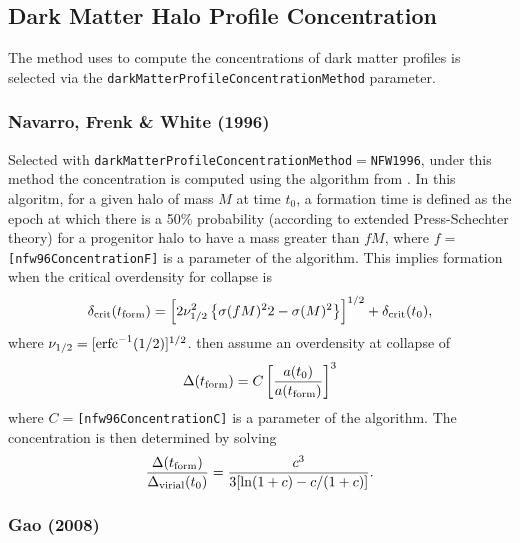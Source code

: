 \subsection{Dark Matter Halo Profile Concentration}\label{sec:DarkMatterProfileConcentration}

The method uses to compute the concentrations of dark matter profiles is selected via the {\tt darkMatterProfileConcentrationMethod} parameter.

\subsubsection{Navarro, Frenk \& White (1996)}\label{phys:darkMatterProfileConcentration:darkMatterProfileConcentrationNFW1996}

Selected with {\tt darkMatterProfileConcentrationMethod}$=${\tt NFW1996}, under this method the concentration is computed using the algorithm from \cite{navarro_structure_1996}. In this algoritm, for a given halo of mass $M$ at time $t_0$, a formation time is defined as the epoch at which there is a 50\% probability (according to extended Press-Schechter theory) for a progenitor halo to have a mass greater than $fM$, where $f=${\tt [nfw96ConcentrationF]} is a parameter of the algorithm. This implies formation when the critical overdensity for collapse is
\begin{equation}
 \delta_{\rm crit}(t_{\rm form}) = \left[ 2 \nu_{1/2}^2 \left\{\sigma(fM)^22-\sigma(M)^2\right\} \right]^{1/2}+\delta_{\rm crit}(t_0),
\end{equation}
where $\nu_{1/2} = [\hbox{erfc}^{-1}(1/2)]^{1/2}$. \cite{navarro_structure_1996} then assume an overdensity at collapse of 
\begin{equation}
 \Delta(t_{\rm form}) = C  \left[ {a(t_0) \over a(t_{\rm form})} \right]^3
\end{equation}
where $C=${\tt [nfw96ConcentrationC]} is a parameter of the algorithm. The concentration is then determined by solving
\begin{equation}
 {\Delta(t_{\rm form}) \over \Delta_{\rm virial}(t_0)} = {c^3 \over 3 [\ln(1+c)-c/(1+c)]}.
\end{equation}

\subsubsection{Gao (2008)}\label{phys:darkMatterProfileConcentration:darkMatterProfileConcentrationGao2008}

